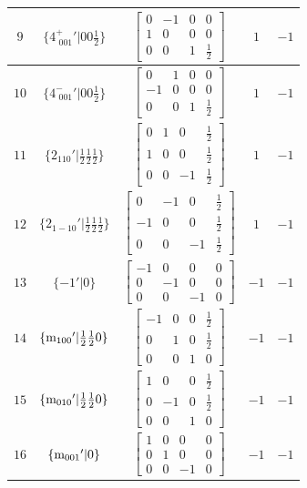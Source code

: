 \documentclass[fleqn,8pt]{jsarticle}
\begin{document}
\begin{longtable}{ccccc}
$ 9 $ & $ \{4^{+}_{\,\,001}{}'|0 0 \frac{1}{2}\} $ & $ \begin{bmatrix} 0 & -1 & 0 & 0 \\ 1 & 0 & 0 & 0 \\ 0 & 0 & 1 & \frac{1}{2} \end{bmatrix} $ & $ 1 $ & $ -1 $ \\ \hline
$ 10 $ & $ \{4^{-}_{\,\,001}{}'|0 0 \frac{1}{2}\} $ & $ \begin{bmatrix} 0 & 1 & 0 & 0 \\ -1 & 0 & 0 & 0 \\ 0 & 0 & 1 & \frac{1}{2} \end{bmatrix} $ & $ 1 $ & $ -1 $ \\ \hline
$ 11 $ & $ \{2{}_{110}{}'|\frac{1}{2} \frac{1}{2} \frac{1}{2}\} $ & $ \begin{bmatrix} 0 & 1 & 0 & \frac{1}{2} \\ 1 & 0 & 0 & \frac{1}{2} \\ 0 & 0 & -1 & \frac{1}{2} \end{bmatrix} $ & $ 1 $ & $ -1 $ \\ \hline
$ 12 $ & $ \{2{}_{1-10}{}'|\frac{1}{2} \frac{1}{2} \frac{1}{2}\} $ & $ \begin{bmatrix} 0 & -1 & 0 & \frac{1}{2} \\ -1 & 0 & 0 & \frac{1}{2} \\ 0 & 0 & -1 & \frac{1}{2} \end{bmatrix} $ & $ 1 $ & $ -1 $ \\ \hline
$ 13 $ & $ \{-1{}'|0\} $ & $ \begin{bmatrix} -1 & 0 & 0 & 0 \\ 0 & -1 & 0 & 0 \\ 0 & 0 & -1 & 0 \end{bmatrix} $ & $ -1 $ & $ -1 $ \\ \hline
$ 14 $ & $ \{{\rm m}_{100}{}'|\frac{1}{2} \frac{1}{2} 0\} $ & $ \begin{bmatrix} -1 & 0 & 0 & \frac{1}{2} \\ 0 & 1 & 0 & \frac{1}{2} \\ 0 & 0 & 1 & 0 \end{bmatrix} $ & $ -1 $ & $ -1 $ \\ \hline
$ 15 $ & $ \{{\rm m}_{010}{}'|\frac{1}{2} \frac{1}{2} 0\} $ & $ \begin{bmatrix} 1 & 0 & 0 & \frac{1}{2} \\ 0 & -1 & 0 & \frac{1}{2} \\ 0 & 0 & 1 & 0 \end{bmatrix} $ & $ -1 $ & $ -1 $ \\ \hline
$ 16 $ & $ \{{\rm m}_{001}{}'|0\} $ & $ \begin{bmatrix} 1 & 0 & 0 & 0 \\ 0 & 1 & 0 & 0 \\ 0 & 0 & -1 & 0 \end{bmatrix} $ & $ -1 $ & $ -1 $ \\
\end{longtable}
\end{document}

